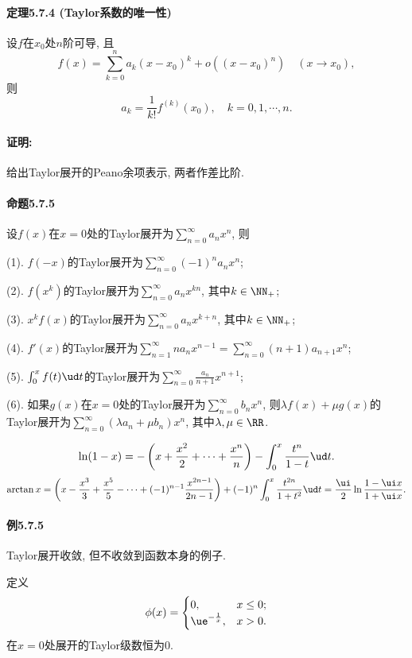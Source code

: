 \paragraph{定理5.7.4 (Taylor系数的唯一性)}

设$f$在$x_{0}$处$n$阶可导, 且
\[
f(x)=\sum_{k=0}^{n}a_{k}(x-x_{0})^{k}+o((x-x_{0})^{n})\quad(x\to x_{0}),
\]
则
\[
a_{k}=\frac{1}{k!}f^{(k)}(x_{0}),\quad k=0,1,\cdots,n.
\]


\paragraph{证明:}

给出Taylor展开的Peano余项表示, 两者作差比阶.

\paragraph{命题5.7.5}

设$f(x)$在$x=0$处的Taylor展开为$\sum_{n=0}^{\infty}a_{n}x^{n}$, 则

(1). $f(-x)$的Taylor展开为$\sum_{n=0}^{\infty}(-1)^{n}a_{n}x^{n}$;

(2). $f(x^{k})$的Taylor展开为$\sum_{n=0}^{\infty}a_{n}x^{kn}$, 其中$k\in\NN_{+}$;

(3). $x^{k}f(x)$的Taylor展开为$\sum_{n=0}^{\infty}a_{n}x^{k+n}$, 其中$k\in\NN_{+}$;

(4). $f'(x)$的Taylor展开为$\sum_{n=1}^{\infty}na_{n}x^{n-1}=\sum_{n=0}^{\infty}(n+1)a_{n+1}x^{n}$;

(5). $\int_{0}^{x}f(t)\ud t$的Taylor展开为$\sum_{n=0}^{\infty}\frac{a_{n}}{n+1}x^{n+1}$;

(6). 如果$g(x)$在$x=0$处的Taylor展开为$\sum_{n=0}^{\infty}b_{n}x^{n}$,
则$\lambda f(x)+\mu g(x)$的Taylor展开为$\sum_{n=0}^{\infty}(\lambda a_{n}+\mu b_{n})x^{n}$,
其中$\lambda,\mu\in\RR$.

\[
\ln(1-x)=-\left(x+\frac{x^{2}}{2}+\cdots+\frac{x^{n}}{n}\right)-\int_{0}^{x}\frac{t^{n}}{1-t}\ud t.
\]
\[
\arctan x=\left(x-\frac{x^{3}}{3}+\frac{x^{5}}{5}-\cdots+(-1)^{n-1}\frac{x^{2n-1}}{2n-1}\right)+(-1)^{n}\int_{0}^{x}\frac{t^{2n}}{1+t^{2}}\ud t=\frac{\ui}{2}\ln\frac{1-\ui x}{1+\ui x}.
\]


\paragraph{例5.7.5 }

Taylor展开收敛, 但不收敛到函数本身的例子.

定义
\[
\phi(x)=\begin{cases}
0, & x\le0;\\
\ue^{-\frac{1}{x}}, & x>0.
\end{cases}
\]
在$x=0$处展开的Taylor级数恒为$0$.

